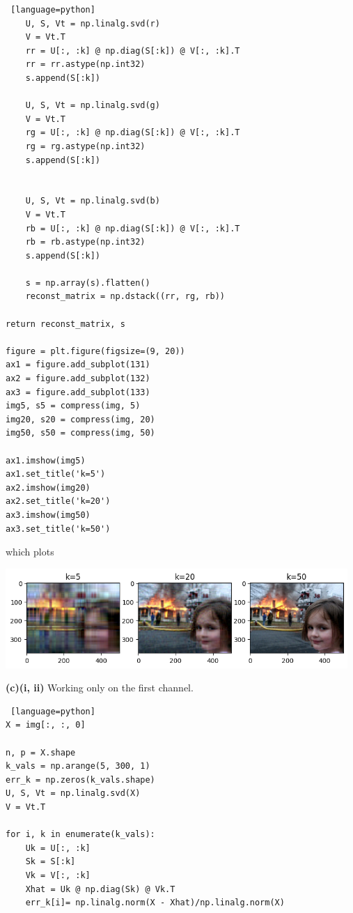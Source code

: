 \documentclass[a4paper, 12pt]{article}
\begin{document}
\begin{solution}
\begin{lstlisting} [language=python]
    U, S, Vt = np.linalg.svd(r)
    V = Vt.T
    rr = U[:, :k] @ np.diag(S[:k]) @ V[:, :k].T
    rr = rr.astype(np.int32)
    s.append(S[:k])
    
    U, S, Vt = np.linalg.svd(g)
    V = Vt.T
    rg = U[:, :k] @ np.diag(S[:k]) @ V[:, :k].T
    rg = rg.astype(np.int32)
    s.append(S[:k])
    
    
    U, S, Vt = np.linalg.svd(b)
    V = Vt.T
    rb = U[:, :k] @ np.diag(S[:k]) @ V[:, :k].T
    rb = rb.astype(np.int32)
    s.append(S[:k])

    s = np.array(s).flatten()
    reconst_matrix = np.dstack((rr, rg, rb))

return reconst_matrix, s

figure = plt.figure(figsize=(9, 20))
ax1 = figure.add_subplot(131)
ax2 = figure.add_subplot(132)
ax3 = figure.add_subplot(133)
img5, s5 = compress(img, 5)
img20, s20 = compress(img, 20)
img50, s50 = compress(img, 50)

ax1.imshow(img5)
ax1.set_title('k=5')
ax2.imshow(img20)
ax2.set_title('k=20')
ax3.imshow(img50)
ax3.set_title('k=50')
\end{lstlisting}
which plots
    \begin{center}
        \includegraphics[width=13cm]{./figures/5.3b.png}
    \end{center}


    \textbf{(c)(i, ii)} Working only on the first channel.
\begin{lstlisting} [language=python]
X = img[:, :, 0]

n, p = X.shape
k_vals = np.arange(5, 300, 1)
err_k = np.zeros(k_vals.shape)
U, S, Vt = np.linalg.svd(X)
V = Vt.T

for i, k in enumerate(k_vals):
    Uk = U[:, :k]
    Sk = S[:k]
    Vk = V[:, :k]
    Xhat = Uk @ np.diag(Sk) @ Vk.T
    err_k[i]= np.linalg.norm(X - Xhat)/np.linalg.norm(X)
    

\end{lstlisting}
\end{solution}
\end{document}
